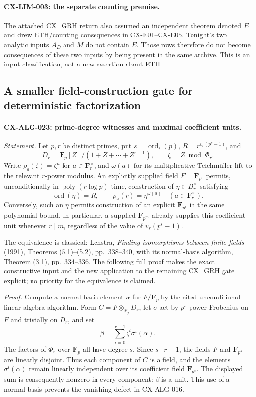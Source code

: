 \documentclass[11pt,a4paper]{article}
\begin{document}
\paragraph{CX-LIM-003: the separate counting premise.}
The attached CX\_GRH return also assumed an independent theorem denoted
$E$ and drew ETH/counting consequences in CX-E01--CX-E05. Tonight's two
analytic inputs $A_D$ and $M$ do not contain $E$. Those rows therefore do
not become consequences of these two inputs by being present in the same
archive. This is an input classification, not a new assertion about ETH.

\subsection{A smaller field-construction gate for deterministic factorization}

\paragraph{CX-ALG-023: prime-degree witnesses and maximal coefficient units.}
\emph{Statement.} Let $p,r$ be distinct primes, put
$s=\operatorname{ord}_r(p)$, $R=r^{v_r(p^s-1)}$, and
\[
 D_r=\mathbf F_p[Z]/(1+Z+\cdots+Z^{r-1}),\qquad \zeta=Z\bmod\Phi_r.
\]
Write $\rho_a(\zeta)=\zeta^a$ for $a\in\mathbf F_r^\times$, and
$\omega(a)$ for its multiplicative Teichm\"uller lift to the relevant
$r$-power modulus. An explicitly supplied field $F=\mathbf F_{p^r}$
permits, unconditionally in $\operatorname{poly}(r\log p)$ time,
construction of $\eta\in D_r^\times$ satisfying
\[
          \operatorname{ord}(\eta)=R,\qquad
          \rho_a(\eta)=\eta^{\omega(a)}\quad(a\in\mathbf F_r^\times).
\]
Conversely, such an $\eta$ permits construction of an explicit
$\mathbf F_{p^r}$ in the same polynomial bound. In particular, a supplied
$\mathbf F_{p^m}$ already supplies this coefficient unit whenever
$r\mid m$, regardless of the value of $v_r(p^s-1)$.

The equivalence is classical: Lenstra, \emph{Finding isomorphisms between
finite fields} (1991), Theorems (5.1)--(5.2), pp.~338--340, with its
normal-basis algorithm, Theorem (3.1), pp.~334--336. The following full
proof makes the exact constructive input and the new application to the
remaining CX\_GRH gate explicit; no priority for the equivalence is claimed.

\emph{Proof.} Compute a normal-basis element $\alpha$ for
$F/\mathbf F_p$ by the cited unconditional linear-algebra algorithm.
Form $C=F\otimes_{\mathbf F_p}D_r$, let $\sigma$ act by $p^s$-power
Frobenius on $F$ and trivially on $D_r$, and set
\[
             \beta=\sum_{i=0}^{r-1}\zeta^i\sigma^i(\alpha).
\]
The factors of $\Phi_r$ over $\mathbf F_p$ all have degree $s$.
Since $s\mid r-1$, the fields $F$ and $\mathbf F_{p^s}$ are linearly
disjoint. Thus each component of $C$ is a field, and the elements
$\sigma^i(\alpha)$ remain linearly independent over its coefficient
field $\mathbf F_{p^s}$. The displayed sum is consequently nonzero in
every component: $\beta$ is a unit. This use of a normal basis prevents
the vanishing defect in CX-ALG-016.
\end{document}
